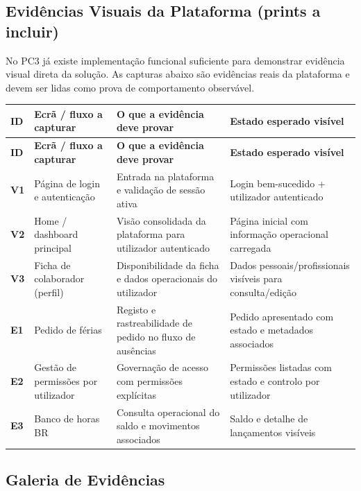 \documentclass[11pt,a4paper,twoside]{article}
\newcommand{\tH}[1]{\textbf{\sffamily\small\color{white}#1}}
\newcommand{\theadrow}{\rowcolor{ACCENT}}
\begin{document}
\subsection{Evidências Visuais da Plataforma (prints a incluir)}

\begin{callout}
No PC3 já existe implementação funcional suficiente para demonstrar evidência visual direta da solução. As capturas abaixo são evidências reais da plataforma e devem ser lidas como prova de comportamento observável.
\end{callout}

\begin{longtable}{>{\small\bfseries}p{2.0cm} >{\small}p{4.1cm} >{\small}p{4.5cm} >{\small}p{3.2cm}}
\theadrow
\tH{ID} & \tH{Ecrã / fluxo a capturar} & \tH{O que a evidência deve provar} & \tH{Estado esperado visível} \\
\midrule
\endfirsthead
\theadrow
\tH{ID} & \tH{Ecrã / fluxo a capturar} & \tH{O que a evidência deve provar} & \tH{Estado esperado visível} \\
\midrule
\endhead
V1 & Página de login e autenticação & Entrada na plataforma e validação de sessão ativa & Login bem-sucedido + utilizador autenticado \\
V2 & Home / dashboard principal & Visão consolidada da plataforma para utilizador autenticado & Página inicial com informação operacional carregada \\
V3 & Ficha de colaborador (perfil) & Disponibilidade da ficha e dados operacionais do utilizador & Dados pessoais/profissionais visíveis para consulta/edição \\
E1 & Pedido de férias & Registo e rastreabilidade de pedido no fluxo de ausências & Pedido apresentado com estado e metadados associados \\
E2 & Gestão de permissões por utilizador & Governação de acesso com permissões explícitas & Permissões listadas com estado e controlo por utilizador \\
E3 & Banco de horas BR & Consulta operacional do saldo e movimentos associados & Saldo e detalhe de lançamentos visíveis \\
\bottomrule
\end{longtable}

\subsection{Galeria de Evidências}
\end{document}
